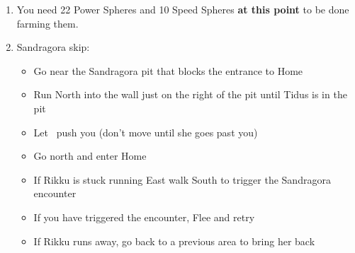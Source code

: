 \begin{enumerate}[resume]
    \blitzballdetermination[true]{%
        \item \formation{\tidus}{\lulu}{\auron}
    }{%
        \item \formation{\tidus}{\rikku}{\auron}
    }
    \item You need 22 Power Spheres and 10 Speed Spheres \textbf{at this point} to be done farming them.
    \item Sandragora skip:
    \begin{itemize}
        \item Go near the Sandragora pit that blocks the entrance to Home
        \item Run North into the wall just on the right of the pit until Tidus is in the pit
        \item Let \rikku\ push you (don't move until she goes past you)
        \item Go north and enter Home
        \item If Rikku is stuck running East walk South to trigger the Sandragora encounter
        \item If you have triggered the encounter, Flee and retry
        \item If Rikku runs away, go back to a previous area to bring her back
    \end{itemize}
\end{enumerate}
\bothcb\winnpsingle\lossnpsingle
